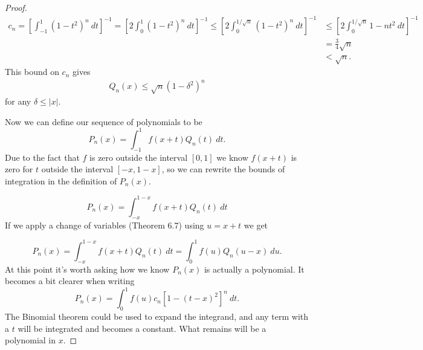 \documentclass{article}
\theoremstyle{definition}
\begin{document}
\begin{proof}
		\begin{align*}
			c_n=\left[\int_{-1}^{1} (1-t^2)^n\ dt\right]^{-1}=\left[2\int_{0}^{1} (1-t^2)^n\ dt\right]^{-1}\le\left[2\int_{0}^{1/\sqrt{n}} (1-t^2)^n \ dt\right]^{-1}&\le\left[2\int_{0}^{1/\sqrt{n}} 1-nt^2 \ dt\right]^{-1}\\&=\frac{3}{4}\sqrt{n}\\&<\sqrt{n}.
		\end{align*}
		This bound on $ c_n $ gives 
		\begin{align}
			Q_n(x)\le \sqrt{n}(1-\delta^2)^n
		\end{align}
		for any $ \delta\le |x| $. 
		
		Now we can define our sequence of polynomials to be $$ P_n(x)=\int_{-1}^{1}f(x+t)Q_n(t)\ dt. $$ Due to the fact that $ f $ is zero outside the interval $ [0,1] $ we know $ f(x+t) $ is zero for $ t $ outside the interval $ [-x,1-x] $, so we can rewrite the bounds of integration in the definition of $ P_n(x) $.  
		
		$$ P_n(x)=\int_{-x}^{1-x}f(x+t)Q_n(t)\ dt$$
		If we apply a change of variables (Theorem 6.7) using $ u=x+t $ we get 
		
		$$ P_n(x)=\int_{-x}^{1-x}f(x+t)Q_n(t)\ dt= \int_{0}^{1}f(u)Q_n(u-x)\ du.$$ At this point it's worth asking how we know $ P_n(x) $ is actually a polynomial. It becomes a bit clearer when writing $$ P_n(x)=\int_{0}^1f(u)c_n[1-(t-x)^2]^n\ dt.$$ The Binomial theorem could be used to expand the integrand, and any term with a $ t $ will be integrated and becomes a constant. What remains will be a polynomial in $ x $.  
		

\end{proof}
\end{document}

